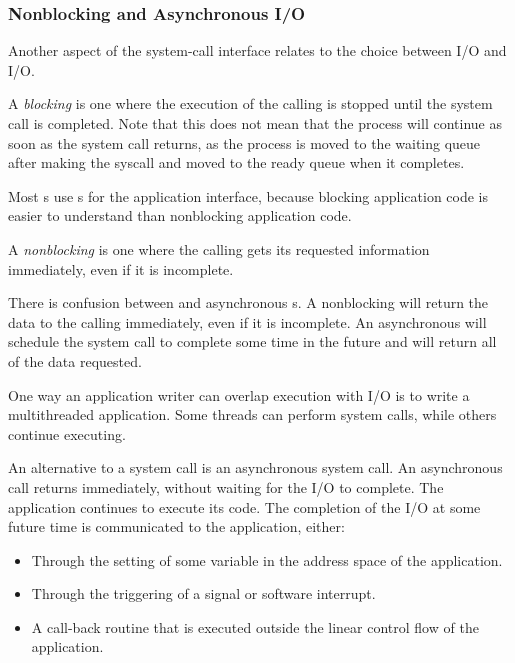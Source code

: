 \subsubsection{Nonblocking and Asynchronous I/O}\label{subsubsec:Nonblocking_Asynchronous_IO}
Another aspect of the system-call interface relates to the choice between  I/O and  I/O.

\begin{definition}[Blocking]\label{def:Blocking_Syscall}
  A \emph{blocking}  is one where the execution of the calling  is stopped until the system call is completed.
  Note that this does not mean that the process will continue as soon as the system call returns, as the process is moved to the waiting queue after making the syscall and moved to the ready queue when it completes.
\end{definition}

Most s use  s for the application interface, because blocking application code is easier to understand than nonblocking application code.

\begin{definition}[Nonblocking]\label{def:Nonblocking_Syscall}
  A \emph{nonblocking}  is one where the calling  gets its requested information immediately, even if it is incomplete.

  \begin{remark}
    There is confusion between  and asynchronous s.
    A nonblocking  will return the data to the calling  immediately, even if it is incomplete.
    An asynchronous  will schedule the system call to complete some time in the future and will return all of the data requested.
  \end{remark}
\end{definition}

One way an application writer can overlap execution with I/O is to write a multithreaded application.
Some threads can perform  system calls, while others continue executing.

An alternative to a  system call is an asynchronous system call.
An asynchronous call returns immediately, without waiting for the I/O to complete.
The application continues to execute its code.
The completion of the I/O at some future time is communicated to the application, either:
\begin{itemize}[noitemsep]
\item Through the setting of some variable in the address space of the application.
\item Through the triggering of a signal or software interrupt.
\item A call-back routine that is executed outside the linear control flow of the application.
\end{itemize}

